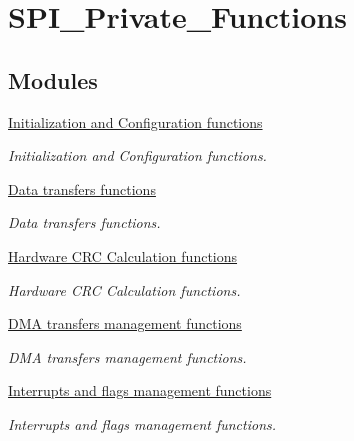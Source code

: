 \hypertarget{group___s_p_i___private___functions}{\section{S\-P\-I\-\_\-\-Private\-\_\-\-Functions}
\label{group___s_p_i___private___functions}
}
\subsection*{Modules}
\begin{DoxyCompactItemize}
\item 
\hyperlink{group___s_p_i___group1}{Initialization and Configuration functions}
\begin{DoxyCompactList}\small\item\em Initialization and Configuration functions. \end{DoxyCompactList}\item 
\hyperlink{group___s_p_i___group2}{Data transfers functions}
\begin{DoxyCompactList}\small\item\em Data transfers functions. \end{DoxyCompactList}\item 
\hyperlink{group___s_p_i___group3}{Hardware C\-R\-C Calculation functions}
\begin{DoxyCompactList}\small\item\em Hardware C\-R\-C Calculation functions. \end{DoxyCompactList}\item 
\hyperlink{group___s_p_i___group4}{D\-M\-A transfers management functions}
\begin{DoxyCompactList}\small\item\em D\-M\-A transfers management functions. \end{DoxyCompactList}\item 
\hyperlink{group___s_p_i___group5}{Interrupts and flags management functions}
\begin{DoxyCompactList}\small\item\em Interrupts and flags management functions. \end{DoxyCompactList}\end{DoxyCompactItemize}
